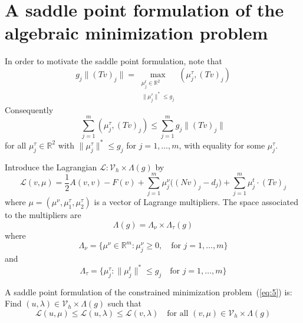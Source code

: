 \documentclass[12pt,a4paper]{article}
\numberwithin{equation}{section}
\numberwithin{table}{section}
\numberwithin{figure}{section}
\newcommand{\R}{\ensuremath{\mathbb{R}}}
\newcommand{\half}{\ensuremath{\frac{1}{2}}}
\newcommand{\Vh}{{\mathcal V}_h}
\renewcommand{\L}{{\mathcal L}}
\newcommand{\sumjm}{\sum_{j=1}^m}
\providecommand{\norm}[1]{\lVert #1 \rVert}
\newcommand{\qforall}{\quad\text{for all }}
\begin{document}
\section{A saddle point formulation of the algebraic minimization problem}
\label{sec:saddle-point-form}

In order to motivate the saddle point formulation, note that
\begin{equation}
  \label{eq:13}
  g_j \norm{(Tv)_j}
  = \max_{\substack{\mu^t_j\in\R^2 \\ \norm{\mu^\tau_j}^*\le g_j}} (\mu^\tau_j, (Tv)_j)
\end{equation}
Consequently
\begin{equation}
  \label{eq:14}
  \sum_{j=1}^m (\mu^\tau_j, (Tv)_j) \le \sum_{j=1}^m g_j \norm{(Tv)_j}
\end{equation}
for all $\mu^\tau_j\in\R^2$ with $\norm{\mu^\tau_j}^*\le g_j$ for $j=1,\dotsc,m$, with equality
for some $\mu^\tau_j$.

Introduce the Lagrangian $\L \colon \Vh\times \Lambda(g)$ by
\begin{equation}
  \label{eq:15}
  \L(v,\mu) = \half A(v,v) - F(v) + \sumjm \mu^\nu_j \bigl((Nv)_j-d_j\bigr)
  + \sumjm \mu^t_j \cdot (Tv)_j
\end{equation}
where $\mu=(\mu^\nu, \mu^\tau_1, \mu^\tau_2)$ is a vector of Lagrange multipliers.  The space
associated to the multipliers are
\begin{equation}
  \label{eq:16}
  \Lambda(g) = \Lambda_\nu \times \Lambda_\tau(g)
\end{equation}
where
\begin{equation}
  \label{eq:17}
  \Lambda_\nu = \{\mu^\nu \in\R^m \colon \mu^\nu_j \ge 0,\quad\text{for }j=1,\dotsc,m \}
\end{equation}
and
\begin{equation}
  \label{eq:18}
  \Lambda_\tau = \{\mu^\tau_j \colon \norm{\mu^t_j}^* \le g_j \quad\text{for }j=1,\dotsc,m\}
\end{equation}

A saddle point formulation of the constrained minimization problem~(\ref{eq:5}) is: Find
$(u,\lambda)\in \Vh\times\Lambda(g)$ such that
\begin{equation}
  \label{eq:SaddlePoint}
  \L(u, \mu) \le \L(u,\lambda) \le \L(v,\lambda) \qforall (v,\mu) \in \Vh\times \Lambda(g)
\end{equation}
\end{document}
